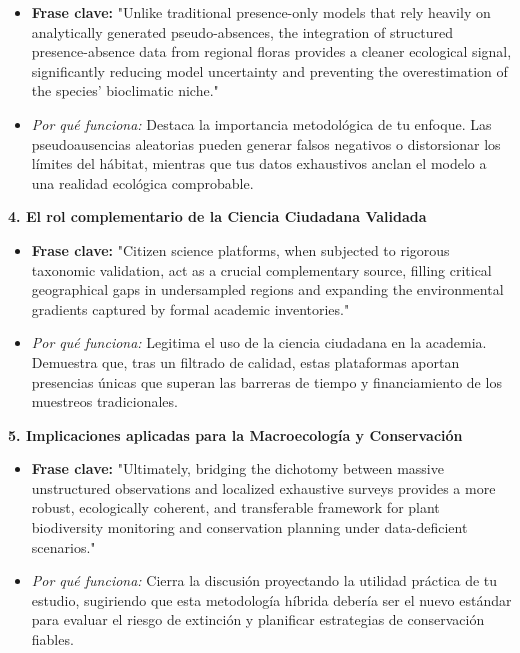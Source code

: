 \documentclass{article}
\begin{document}
\begin{itemize}
\begin{itemize}
        \item \textbf{Frase clave:} "Unlike traditional presence-only models that rely heavily on analytically generated pseudo-absences, the integration of structured presence-absence data from regional floras provides a cleaner ecological signal, significantly reducing model uncertainty and preventing the overestimation of the species' bioclimatic niche."
        \item \textit{Por qué funciona:} Destaca la importancia metodológica de tu enfoque. Las pseudoausencias aleatorias pueden generar falsos negativos o distorsionar los límites del hábitat, mientras que tus datos exhaustivos anclan el modelo a una realidad ecológica comprobable.
\end{itemize}
\textbf{4. El rol complementario de la Ciencia Ciudadana Validada}

\begin{itemize}
        \item \textbf{Frase clave:} "Citizen science platforms, when subjected to rigorous taxonomic validation, act as a crucial complementary source, filling critical geographical gaps in undersampled regions and expanding the environmental gradients captured by formal academic inventories."
        \item \textit{Por qué funciona:} Legitima el uso de la ciencia ciudadana en la academia. Demuestra que, tras un filtrado de calidad, estas plataformas aportan presencias únicas que superan las barreras de tiempo y financiamiento de los muestreos tradicionales.
\end{itemize}
\textbf{5. Implicaciones aplicadas para la Macroecología y Conservación}

\begin{itemize}
        \item \textbf{Frase clave:} "Ultimately, bridging the dichotomy between massive unstructured observations and localized exhaustive surveys provides a more robust, ecologically coherent, and transferable framework for plant biodiversity monitoring and conservation planning under data-deficient scenarios."
        \item \textit{Por qué funciona:} Cierra la discusión proyectando la utilidad práctica de tu estudio, sugiriendo que esta metodología híbrida debería ser el nuevo estándar para evaluar el riesgo de extinción y planificar estrategias de conservación fiables.
\end{itemize}

    \
\end{itemize}
\end{document}
